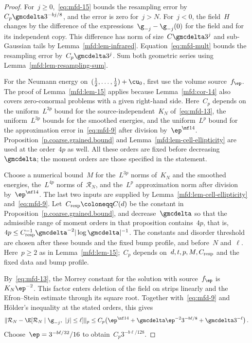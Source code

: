 \documentclass[11pt]{amsart}
\begin{document}
\begin{proof}
For~$j\geq0$,~\eqref{eq:mfd-15} bounds the resampling error by~$C_p\gmcdelta3^{-bj/8}$, and the error is zero for~$j>N$. For~$j<0$, the field~$H$ changes by the difference of the expressions~$\g_{-j}-\g_{-j}(0)$ for the field and for its independent copy. This difference has norm of size~$C\gmcdelta3^j$ and sub-Gaussian tails by Lemma~\ref{mfd:lem-infrared}. Equation~\eqref{eq:mfd-mult} bounds the resampling error by~$C_p\gmcdelta3^j$. Sum both geometric series using Lemma~\ref{mfd:lem-resampling-sum}.

\smallskip

For the Neumann energy on~$(\tfrac12,\dots,\tfrac12)+\cu_0$, first use the volume source~$f_\ep$. The proof of Lemma~\ref{mfd:lem-15} applies because Lemma~\ref{mfd:cor-14} also covers zero-conormal problems with a given right-hand side. Here~$C_p$ depends on the uniform~$L^{3p}$ bound for the source-independent~$K_N$ of~\eqref{eq:mfd-13}, the uniform~$L^{3p}$ bounds for the smoothed energies, and the uniform~$L^p$ bound for the approximation error in~\eqref{eq:mfd-9} after division by~$\ep^{\nf14}$. Proposition~\ref{p.coarse.grained.bound} and Lemma~\ref{mfd:lem-cell-ellipticity} are used at the order~$4p$ as well. All these orders are fixed before decreasing~$\gmcdelta$; the moment orders are those specified in the statement.

\smallskip

Choose a numerical bound~$M$ for the~$L^{3p}$ norms of~$K_N$ and the smoothed energies, the~$L^{4p}$ norms of~$\mathcal R_N$, and the~$L^p$ approximation norm after division by~$\ep^{\nf14}$. The last two inputs are supplied by Lemma~\ref{mfd:lem-cell-ellipticity} and~\eqref{eq:mfd-9}. Let~$C_{\rm resp}\coloneqq C(d)$ be the constant in Proposition~\ref{p.coarse.grained.bound}, and decrease~$\gmcdelta$ so that the admissible range of moment orders in that proposition contains~$4p$, that is,~$4p\leq C_{\rm resp}^{-1}\gmcdelta^{-2}|\log\gmcdelta|^{-1}$. The constants and disorder threshold are chosen after these bounds and the fixed bump profile, and before~$N$ and~$\ell$. Here~$p\geq2$ as in Lemma~\ref{mfd:lem-15};~$C_p$ depends on~$d,t,p,M,C_{\rm resp}$ and the fixed data and bump profile.

\smallskip

By~\eqref{eq:mfd-13}, the Morrey constant for the solution with source~$f_\ep$ is~$K_N\ep^{-2}$. This factor enters deletion of the field on strips linearly and the Efron--Stein estimate through its square root. Together with~\eqref{eq:mfd-9} and H\"older's inequality at the stated orders, this gives
\begin{equation*}
	\|\mathcal R_N-\E[\mathcal R_N\mid\g_{-j},\ |j|\leq\ell]\|_p
	\leq C_p\bigl(\ep^{\nf14}
	+\gmcdelta\ep^{-2}3^{-b\ell/8}
	+\gmcdelta3^{-\ell}\bigr)\,.
\end{equation*}
Choose~$\ep=3^{-b\ell/32}/16$ to obtain~$C_p3^{-b\ell/128}$.


\end{proof}
\end{document}
